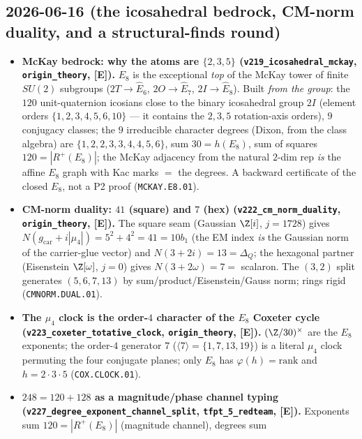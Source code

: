 \documentclass[11pt]{article}
\providecommand{\mE}{\textbf{[E]}}\providecommand{\mC}{\textbf{[C]}}
\providecommand{\gcar}{g_{\mathrm{car}}}\providecommand{\Nfam}{N_{\mathrm{fam}}}
\begin{document}
\subsection*{2026-06-16 (the icosahedral bedrock, CM-norm duality, and a structural-finds round)}
\begin{itemize}
\item \textbf{McKay bedrock: why the atoms are $\{2,3,5\}$ (\texttt{v219\_icosahedral\_mckay},
  \texttt{origin\_theory}, \mE).} $E_8$ is the exceptional \emph{top} of the McKay tower of finite
  $SU(2)$ subgroups ($2T{\to}\hat E_6$, $2O{\to}\hat E_7$, $2I{\to}\hat E_8$). Built \emph{from the
  group}: the $120$ unit-quaternion icosians close to the binary icosahedral group $2I$ (element orders
  $\{1,2,3,4,5,6,10\}$ --- it contains the $2,3,5$ rotation-axis orders), $9$ conjugacy classes; the
  $9$ irreducible character degrees (Dixon, from the class algebra) are $\{1,2,2,3,3,4,4,5,6\}$, sum
  $30{=}h(E_8)$, sum of squares $120{=}|R^+(E_8)|$; the McKay adjacency from the natural $2$-dim rep
  \emph{is} the affine $E_8$ graph with Kac marks $=$ the degrees. A backward certificate of the closed
  $E_8$, not a P2 proof (\texttt{MCKAY.E8.01}).
\item \textbf{CM-norm duality: $41$ (square) and $7$ (hex) (\texttt{v222\_cm\_norm\_duality},
  \texttt{origin\_theory}, \mE).} The square seam (Gaussian $\Z[i]$, $j{=}1728$) gives
  $N(\gcar{+}i|\mu_4|){=}5^2{+}4^2{=}41{=}10b_1$ (the EM index \emph{is} the Gaussian norm of the
  carrier-glue vector) and $N(3{+}2i){=}13{=}\Delta_Q$; the hexagonal partner (Eisenstein $\Z[\omega]$,
  $j{=}0$) gives $N(3{+}2\omega){=}7{=}$ scalaron. The $(3,2)$ split generates $(5,6,7,13)$ by
  sum/product/Eisenstein/Gauss norm; rings rigid (\texttt{CMNORM.DUAL.01}).
\item \textbf{The $\mu_4$ clock is the order-$4$ character of the $E_8$ Coxeter cycle
  (\texttt{v223\_\allowbreak coxeter\_\allowbreak totative\_\allowbreak clock}, \texttt{origin\_theory}, \mE).} $(\Z/30)^\times$ are the
  $E_8$ exponents; the order-$4$ generator $7$ ($\langle7\rangle{=}\{1,7,13,19\}$) is a literal $\mu_4$
  clock permuting the four conjugate planes; only $E_8$ has $\varphi(h){=}\mathrm{rank}$ and
  $h{=}2{\cdot}3{\cdot}5$ (\texttt{COX.CLOCK.01}).
\item \textbf{$248{=}120{+}128$ as a magnitude/phase channel typing
  (\texttt{v227\_\allowbreak degree\_\allowbreak exponent\_\allowbreak channel\_\allowbreak split},
  \texttt{tfpt\_5\_redteam}, \mE).} Exponents sum $120{=}|R^+(E_8)|$ (magnitude channel), degrees sum

\end{itemize}
\end{document}
